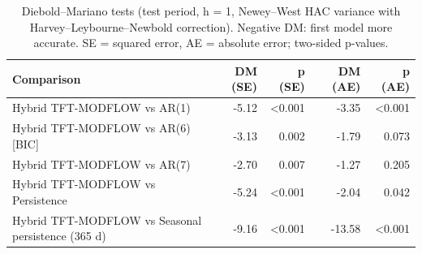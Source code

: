 \begin{table}[htbp]
\centering
\caption{Diebold--Mariano tests (test period, h = 1, Newey--West HAC variance with Harvey--Leybourne--Newbold correction). Negative DM: first model more accurate. SE = squared error, AE = absolute error; two-sided p-values.}
\label{tab:dm_test}
\begin{tabular}{lrrrr}
\hline
Comparison & DM (SE) & p (SE) & DM (AE) & p (AE) \\
\hline
Hybrid TFT-MODFLOW vs AR(1) & -5.12 & <0.001 & -3.35 & <0.001 \\
Hybrid TFT-MODFLOW vs AR(6) [BIC] & -3.13 & 0.002 & -1.79 & 0.073 \\
Hybrid TFT-MODFLOW vs AR(7) & -2.70 & 0.007 & -1.27 & 0.205 \\
Hybrid TFT-MODFLOW vs Persistence & -5.24 & <0.001 & -2.04 & 0.042 \\
Hybrid TFT-MODFLOW vs Seasonal persistence (365 d) & -9.16 & <0.001 & -13.58 & <0.001 \\
\hline
\end{tabular}
\end{table}